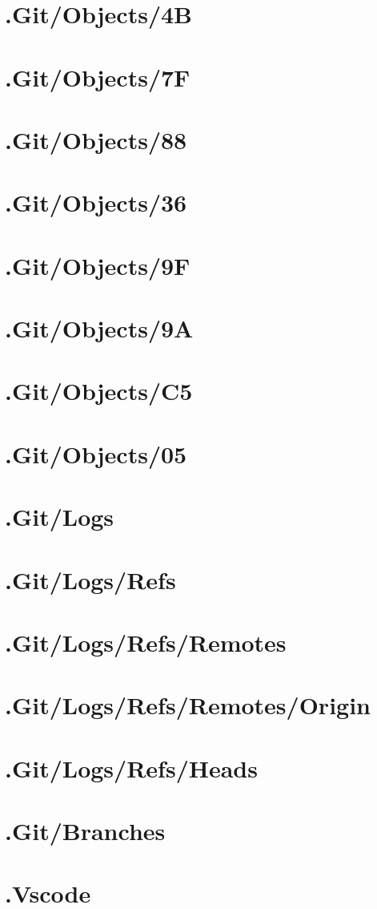 \section*{.Git/Objects/4B}

\section*{.Git/Objects/7F}

\section*{.Git/Objects/88}

\section*{.Git/Objects/36}

\section*{.Git/Objects/9F}

\section*{.Git/Objects/9A}

\section*{.Git/Objects/C5}

\section*{.Git/Objects/05}

\section*{.Git/Logs}

\section*{.Git/Logs/Refs}

\section*{.Git/Logs/Refs/Remotes}

\section*{.Git/Logs/Refs/Remotes/Origin}

\section*{.Git/Logs/Refs/Heads}

\section*{.Git/Branches}

\section*{.Vscode}

